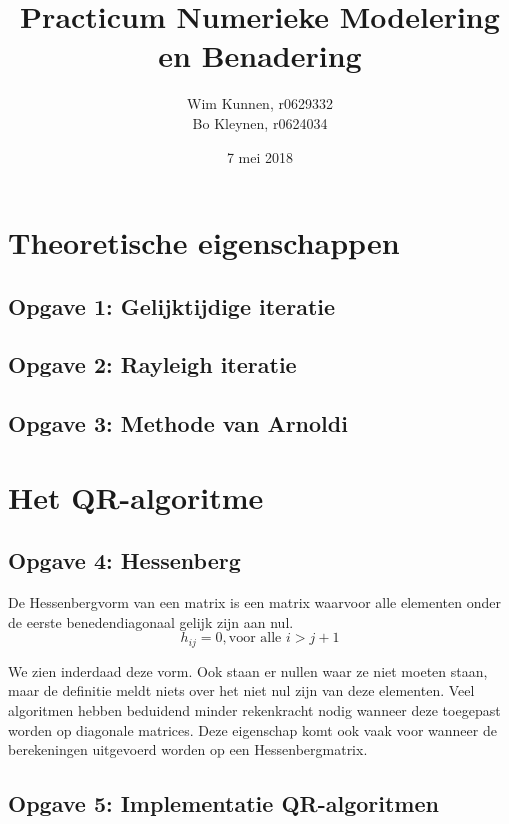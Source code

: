 \documentclass[a4paper]{article}
\title{Practicum Numerieke Modelering en Benadering}
\author{Wim Kunnen, r0629332 \\ Bo Kleynen, r0624034}
\date{7 mei 2018}
\newcommand{\opgave}[1]{\subsection{Opgave #1}}
\begin{document}
\begin{titlepage}
\maketitle
\thispagestyle{empty}
\end{titlepage}


\setcounter{page}{1}
\tableofcontents
\cleardoublepage

\listoffigures
{}

\listoftables
{}

\lstlistoflistings
{}

\cleardoublepage



\setcounter{page}{1}

\section{Theoretische eigenschappen}\label{sec:theorie}

\opgave{1: Gelijktijdige iteratie}\label{sec:oef1}

\opgave{2: Rayleigh iteratie}\label{sec:oef2}

\opgave{3: Methode van Arnoldi}\label{sec:oef3}

\section{Het QR-algoritme}\label{sec:QR}

\opgave{4: Hessenberg}\label{sec:oef4}

De Hessenbergvorm van een matrix is een matrix waarvoor alle elementen onder de eerste benedendiagonaal gelijk zijn aan nul.
\begin{equation}\nonumber
	h_{ij} =0 , \text{voor alle } i > j+1
\end{equation}

We zien inderdaad deze vorm. Ook staan er nullen waar ze niet moeten staan, maar de definitie meldt niets over het niet nul zijn van deze elementen. Veel algoritmen hebben beduidend minder rekenkracht nodig wanneer deze toegepast worden op diagonale matrices. Deze eigenschap komt ook vaak voor wanneer de berekeningen uitgevoerd worden op een Hessenbergmatrix.
\opgave{5: Implementatie QR-algoritmen}\label{sec:oef5}
\end{document}
